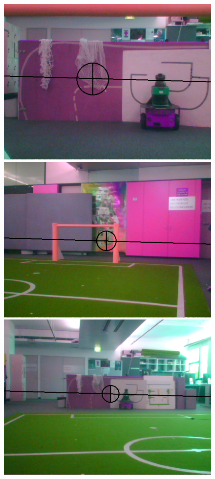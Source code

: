 \documentclass[runningheads,a4paper]{llncs}
\begin{document}
\begin{figure} [h]
\begin{minipage}[b]{0.5\textwidth}
\includegraphics[width=1\textwidth]{figures/img23.png}
\end{minipage}
\begin{minipage}[b]{0.5\textwidth}
\centering
\includegraphics[width=1\textwidth]{figures/img33.png}
\end{minipage}
\begin{minipage}[b]{0.5\textwidth}
\centering
\includegraphics[width=1\textwidth]{figures/img54.png}

\end{minipage}
\end{figure}
\end{document}
